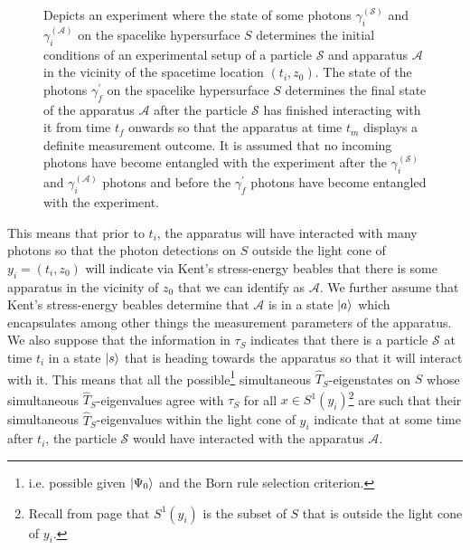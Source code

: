 \begin{figure}[ht!]
	\vspace*{2px}
	\caption{Depicts an experiment where the state of some photons $\gamma_i^{(\mathcal{S})}$ and $\gamma_i^{(\mathcal{A})}$ on the spacelike hypersurface $S$ determines the initial conditions of an experimental setup of a particle $\mathcal{S}$ and apparatus $\mathcal{A}$ in the vicinity of the spacetime location $( t_i, z_0)$.  The state of the photons $\gamma_f^{\prime}$ on the spacelike hypersurface $S$ determines the final state of the apparatus $\mathcal{A}$ after the particle $ \mathcal{S}$ has finished interacting with it from time $t_f$ onwards so that the apparatus at time $t_m$ displays a definite measurement outcome. It is assumed that no incoming photons have become entangled with the experiment after the $\gamma_i^{(\mathcal{S})}$ and $\gamma_i^{(\mathcal{A})}$ photons and before the $\gamma_f^{\prime}$ photons have become entangled with the experiment.  }
	\label{pisolution}
	\end{figure}
This means that prior to $t_i$, the apparatus will have interacted with many photons so that the photon detections on $S$ outside the light cone of $y_i=(t_i, z_0)$ will indicate via Kent's stress-energy beables that there is some apparatus in the vicinity of $z_0$ that we can identify as $\mathcal{A}$. We further assume that Kent's stress-energy beables determine that $\mathcal{A}$ is in a state $\ket{a}$ which encapsulates among other things the measurement parameters of the apparatus.  We also suppose that the information in $\tau_S$ indicates that there is a particle $\mathcal{S}$ at time $t_i$ in a state
$\ket{s}$ that is heading towards the apparatus so that it will interact with it. This means that all the 
possible\footnote{i.e. possible given $\ket{\Psi_0}$ and the Born rule selection criterion.} 
simultaneous $\hat{T}_S$-eigenstates on $S$ whose simultaneous $\hat{T}_S$-eigenvalues agree with $\tau_S$ for all $x\in S^1(y_i)$\footnote{Recall from page \pageref{S2} that $S^1(y_i)$ is the subset of $S$ that is outside the light cone of $y_i$.} 
 are such that their simultaneous $\hat{T}_S$-eigenvalues within the light cone of $y_i$ indicate that at some time after $t_i$, the particle $\mathcal{S}$ would have interacted
with the apparatus $\mathcal{A}$. 


